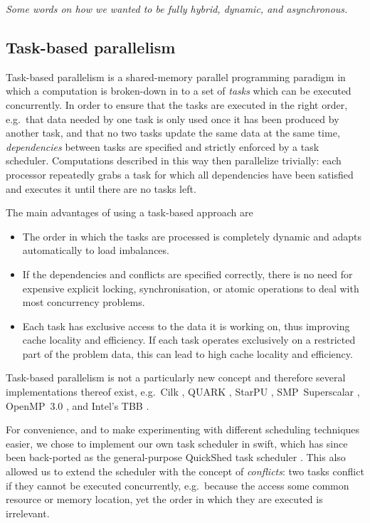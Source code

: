 \documentclass{sig-alternate-05-2015}
\newcommand{\swift}{{\sc swift}\xspace}
\newcommand{\qs}{{\sc QuickShed}\xspace}
\begin{document}
{\em Some words on how we wanted to be fully hybrid, dynamic,
and asynchronous.}

\subsection{Task-based parallelism}

Task-based parallelism is a shared-memory parallel programming
paradigm in which a computation is broken-down in to a set of
{\em tasks} which can be executed  concurrently.
In order to ensure that the tasks are executed in the right
order, e.g.~that data needed by one task is only used once it
has been produced by another task, and that no two tasks
update the same data at the same time, {\em dependencies} between
tasks are specified and strictly enforced by a task scheduler.
Computations described in this way then parallelize trivially:
each processor repeatedly grabs a task for which all dependencies
have been satisfied and executes it until there are no tasks left.

The main advantages of using a task-based approach are
%
\begin{itemize}
    \item The order in which the tasks are processed is completely
        dynamic and adapts automatically to load imbalances.
    \item If the dependencies and conflicts are specified correctly,
        there is no need for expensive explicit locking, synchronisation,
        or atomic operations to deal with most concurrency problems.
    \item Each task has exclusive access to the data it is working on,
        thus improving cache locality and efficiency.
        If each task operates exclusively on a restricted part of the
        problem data, this can lead to high cache locality and efficiency.
\end{itemize}
%
Task-based parallelism is not a particularly new concept and therefore
several implementations thereof exist, e.g.~Cilk \cite{ref:Blumofe1995},
QUARK \cite{ref:QUARK}, StarPU \cite{ref:Augonnet2011},
SMP~Superscalar \cite{ref:SMPSuperscalar}, OpenMP~3.0 \cite{ref:Duran2009},
and Intel's TBB \cite{ref:Reinders2007}.

For convenience, and to make experimenting with different scheduling
techniques easier, we chose to implement our own task scheduler
in \swift, which has since been back-ported as the general-purpose
\qs task scheduler \cite{gonnet2013quicksched}.
This also allowed us to extend the scheduler with the concept of
{\em conflicts}: two tasks conflict if they cannot be executed
concurrently, e.g.~because the access some common resource or memory
location, yet the order in which they are executed is irrelevant.
\end{document}
